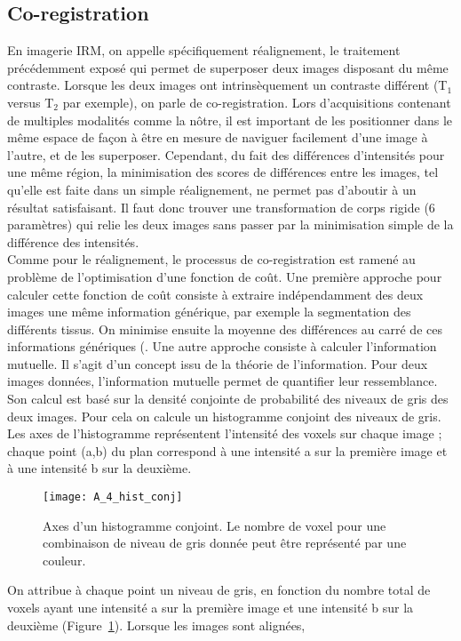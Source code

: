 \subsection{Co-registration}
En imagerie IRM, on appelle spécifiquement réalignement, le traitement précédemment
exposé qui permet de superposer deux images disposant du même contraste. Lorsque les deux images
ont intrinsèquement un contraste différent (T$_1$ versus T$_2$ par exemple), on parle de co-registration.
Lors d’acquisitions contenant de multiples modalités comme la nôtre, il est important de les
positionner dans le même espace de façon à être en mesure de naviguer facilement d’une image à
l’autre, et de les superposer. Cependant, du fait des différences d’intensités pour une même région, la
minimisation des scores de différences entre les images, tel qu’elle est faite dans un simple
réalignement, ne permet pas d’aboutir à un résultat satisfaisant. Il faut donc trouver une
transformation de corps rigide (6 paramètres) qui relie les deux images sans passer par la minimisation
simple de la différence des intensités.\\
Comme pour le réalignement, le processus de co-registration est ramené au problème de
l’optimisation d’une fonction de coût. Une première approche pour calculer cette fonction de coût
consiste à extraire indépendamment des deux images une même information générique, par exemple
la segmentation des différents tissus. On minimise ensuite la moyenne des différences au carré de ces
informations génériques (\cite{Ashburner1997}. Une autre approche consiste à calculer l’information mutuelle. Il s’agit
d’un concept issu de la théorie de l’information. Pour deux images données, l’information mutuelle
permet de quantifier leur ressemblance. Son calcul est basé sur la densité conjointe de probabilité des
niveaux de gris des deux images. Pour cela on calcule un histogramme conjoint des niveaux de gris. Les axes de l’histogramme représentent l’intensité des voxels sur chaque image ; chaque point (a,b) du
plan correspond à une intensité a sur la première image et à une intensité b sur la deuxième. 
\begin{figure}[!t]
\centering
\texttt{[image: A\_4\_hist\_conj]}
\caption{Axes d'un histogramme conjoint. Le nombre de voxel pour une combinaison de niveau de gris donnée peut être
représenté par une couleur.}
\label{fig:A_4_hist_conj}	
\end{figure}
On
attribue à chaque point un niveau de gris, en fonction du nombre total de voxels ayant une intensité a
sur la première image et une intensité b sur la deuxième (Figure~\ref{fig:A_4_hist_conj}). Lorsque les images sont alignées,
